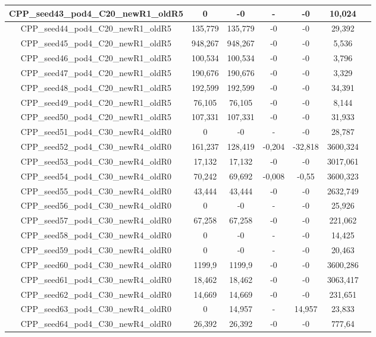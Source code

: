 \documentclass[a4paper]{article}
\begin{document}
\begin{center}
\begin{longtable}{ccccccc}
\hline
CPP\_seed43\_pod4\_C20\_newR1\_oldR5 & 0 & -0 & - & -0 & 10,024\\
\hline
CPP\_seed44\_pod4\_C20\_newR1\_oldR5 & 135,779 & 135,779 & -0 & -0 & 29,392\\
\hline
CPP\_seed45\_pod4\_C20\_newR1\_oldR5 & 948,267 & 948,267 & -0 & -0 & 5,536\\
\hline
CPP\_seed46\_pod4\_C20\_newR1\_oldR5 & 100,534 & 100,534 & -0 & -0 & 3,796\\
\hline
CPP\_seed47\_pod4\_C20\_newR1\_oldR5 & 190,676 & 190,676 & -0 & -0 & 3,329\\
\hline
CPP\_seed48\_pod4\_C20\_newR1\_oldR5 & 192,599 & 192,599 & -0 & -0 & 34,391\\
\hline
CPP\_seed49\_pod4\_C20\_newR1\_oldR5 & 76,105 & 76,105 & -0 & -0 & 8,144\\
\hline
CPP\_seed50\_pod4\_C20\_newR1\_oldR5 & 107,331 & 107,331 & -0 & -0 & 31,933\\
\hline
CPP\_seed51\_pod4\_C30\_newR4\_oldR0 & 0 & -0 & - & -0 & 28,787\\
\hline
CPP\_seed52\_pod4\_C30\_newR4\_oldR0 & 161,237 & 128,419 & -0,204 & -32,818 & 3600,324\\
\hline
CPP\_seed53\_pod4\_C30\_newR4\_oldR0 & 17,132 & 17,132 & -0 & -0 & 3017,061\\
\hline
CPP\_seed54\_pod4\_C30\_newR4\_oldR0 & 70,242 & 69,692 & -0,008 & -0,55 & 3600,323\\
\hline
CPP\_seed55\_pod4\_C30\_newR4\_oldR0 & 43,444 & 43,444 & -0 & -0 & 2632,749\\
\hline
CPP\_seed56\_pod4\_C30\_newR4\_oldR0 & 0 & -0 & - & -0 & 25,926\\
\hline
CPP\_seed57\_pod4\_C30\_newR4\_oldR0 & 67,258 & 67,258 & -0 & -0 & 221,062\\
\hline
CPP\_seed58\_pod4\_C30\_newR4\_oldR0 & 0 & -0 & - & -0 & 14,425\\
\hline
CPP\_seed59\_pod4\_C30\_newR4\_oldR0 & 0 & -0 & - & -0 & 20,463\\
\hline
CPP\_seed60\_pod4\_C30\_newR4\_oldR0 & 1199,9 & 1199,9 & -0 & -0 & 3600,286\\
\hline
CPP\_seed61\_pod4\_C30\_newR4\_oldR0 & 18,462 & 18,462 & -0 & -0 & 3063,417\\
\hline
CPP\_seed62\_pod4\_C30\_newR4\_oldR0 & 14,669 & 14,669 & -0 & -0 & 231,651\\
\hline
CPP\_seed63\_pod4\_C30\_newR4\_oldR0 & 0 & 14,957 & - & 14,957 & 23,833\\
\hline
CPP\_seed64\_pod4\_C30\_newR4\_oldR0 & 26,392 & 26,392 & -0 & -0 & 777,64\\

\end{longtable}
\end{center}
\end{document}
